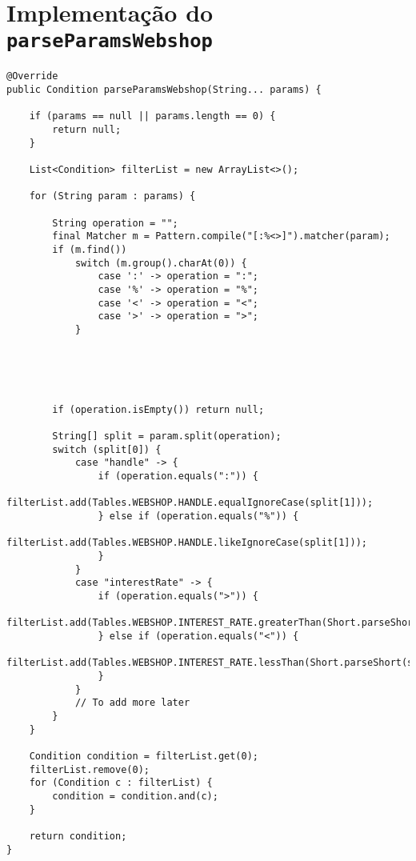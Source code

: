 \chapter{Implementação do \texttt{parseParamsWebshop}}\label{an1}

\begin{verbatim}
@Override
public Condition parseParamsWebshop(String... params) {

	if (params == null || params.length == 0) {
		return null;
	}

	List<Condition> filterList = new ArrayList<>();

	for (String param : params) {

		String operation = "";
		final Matcher m = Pattern.compile("[:%<>]").matcher(param);
		if (m.find())
			switch (m.group().charAt(0)) {
				case ':' -> operation = ":";
				case '%' -> operation = "%";
				case '<' -> operation = "<";
				case '>' -> operation = ">";
			}




			
		if (operation.isEmpty()) return null;

		String[] split = param.split(operation);
		switch (split[0]) {
			case "handle" -> {
				if (operation.equals(":")) {
					filterList.add(Tables.WEBSHOP.HANDLE.equalIgnoreCase(split[1]));
				} else if (operation.equals("%")) {
					filterList.add(Tables.WEBSHOP.HANDLE.likeIgnoreCase(split[1]));
				}
			}
			case "interestRate" -> {
				if (operation.equals(">")) {
					filterList.add(Tables.WEBSHOP.INTEREST_RATE.greaterThan(Short.parseShort(split[1])));
				} else if (operation.equals("<")) {
					filterList.add(Tables.WEBSHOP.INTEREST_RATE.lessThan(Short.parseShort(split[1])));
				}
			}
			// To add more later
		}
	}

	Condition condition = filterList.get(0);
	filterList.remove(0);
	for (Condition c : filterList) {
		condition = condition.and(c);
	}

	return condition;
}
\end{verbatim}